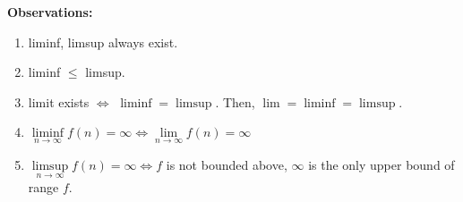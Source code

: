 \documentclass[../main.tex]{subfiles}
\begin{document}
\textbf{Observations:}
\begin{enumerate}
    \item liminf, limsup always exist.
    \item liminf $\leq$ limsup.
    \item limit exists $\iff$ $\liminf = \limsup$. Then, $\lim = \liminf = \limsup$.
    \item $\liminf\limits_{n \rightarrow \infty} f(n) = \infty \iff \lim\limits_{n \rightarrow \infty} f(n) = \infty$
    \item $\limsup\limits_{n \rightarrow \infty} f(n) = \infty \iff f$ is not
        bounded above, $\infty$ is the only upper bound of range $f$.
\end{enumerate}
\end{document}
